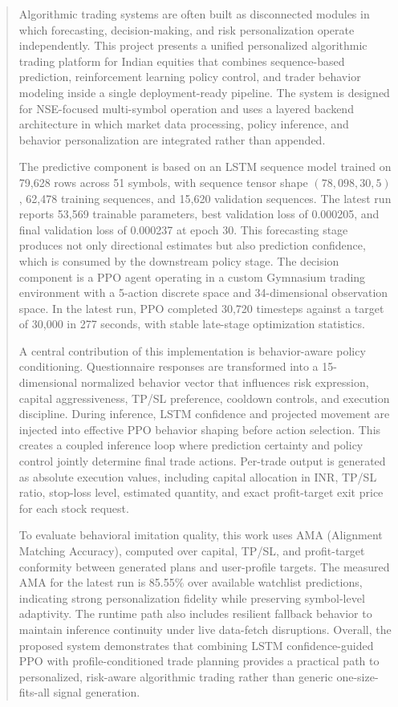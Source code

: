 \begin{abstract}
Algorithmic trading systems are often built as disconnected modules in which forecasting, decision-making, and risk personalization operate independently. This project presents a unified personalized algorithmic trading platform for Indian equities that combines sequence-based prediction, reinforcement learning policy control, and trader behavior modeling inside a single deployment-ready pipeline. The system is designed for NSE-focused multi-symbol operation and uses a layered backend architecture in which market data processing, policy inference, and behavior personalization are integrated rather than appended.

The predictive component is based on an LSTM sequence model trained on 79,628 rows across 51 symbols, with sequence tensor shape \((78{,}098, 30, 5)\), 62,478 training sequences, and 15,620 validation sequences. The latest run reports 53,569 trainable parameters, best validation loss of 0.000205, and final validation loss of 0.000237 at epoch 30. This forecasting stage produces not only directional estimates but also prediction confidence, which is consumed by the downstream policy stage. The decision component is a PPO agent operating in a custom Gymnasium trading environment with a 5-action discrete space and 34-dimensional observation space. In the latest run, PPO completed 30,720 timesteps against a target of 30,000 in 277 seconds, with stable late-stage optimization statistics.

A central contribution of this implementation is behavior-aware policy conditioning. Questionnaire responses are transformed into a 15-dimensional normalized behavior vector that influences risk expression, capital aggressiveness, TP/SL preference, cooldown controls, and execution discipline. During inference, LSTM confidence and projected movement are injected into effective PPO behavior shaping before action selection. This creates a coupled inference loop where prediction certainty and policy control jointly determine final trade actions. Per-trade output is generated as absolute execution values, including capital allocation in INR, TP/SL ratio, stop-loss level, estimated quantity, and exact profit-target exit price for each stock request.

To evaluate behavioral imitation quality, this work uses AMA (Alignment Matching Accuracy), computed over capital, TP/SL, and profit-target conformity between generated plans and user-profile targets. The measured AMA for the latest run is 85.55\% over available watchlist predictions, indicating strong personalization fidelity while preserving symbol-level adaptivity. The runtime path also includes resilient fallback behavior to maintain inference continuity under live data-fetch disruptions. Overall, the proposed system demonstrates that combining LSTM confidence-guided PPO with profile-conditioned trade planning provides a practical path to personalized, risk-aware algorithmic trading rather than generic one-size-fits-all signal generation.
\end{abstract}
